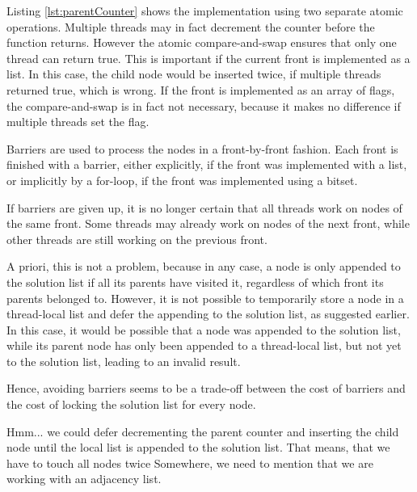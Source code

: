 Listing \ref{lst:parentCounter} shows the implementation using two separate atomic operations. Multiple threads may in fact decrement the counter before the function returns.
However the atomic compare-and-swap ensures that only one thread can return true. This is important if the current front is implemented as a list.
In this case, the child node would be inserted twice, if multiple threads returned true, which is wrong.
If the front is implemented as an array of flags, the compare-and-swap is in fact not necessary, because it makes no difference if multiple threads set the flag.

Barriers are used to process the nodes in a front-by-front fashion.
Each front is finished with a barrier, either explicitly, if the front was implemented with a list, or implicitly by a for-loop, if the front was implemented using a bitset.

If barriers are given up, it is no longer certain that all threads work on nodes of the same front.
Some threads may already work on nodes of the next front, while other threads are still working on the previous front.

A priori, this is not a problem, because in any case, a node is only appended to the solution list if all its parents have visited it, regardless of which front its parents belonged to.
However, it is not possible to temporarily store a node in a thread-local list and defer the appending to the solution list, as suggested earlier.
In this case, it would be possible that a node was appended to the solution list, while its parent node has only been appended to a thread-local list, but not yet to the solution list, leading to an invalid result.

Hence, avoiding barriers seems to be a trade-off between the cost of barriers and the cost of locking the solution list for every node.

\begin{invisible}
Hmm... we could defer decrementing the parent counter and inserting the child node until the local list is appended to the solution list. That means, that we have to touch all nodes twice
Somewhere, we need to mention that we are working with an adjacency list.
\end{invisible}